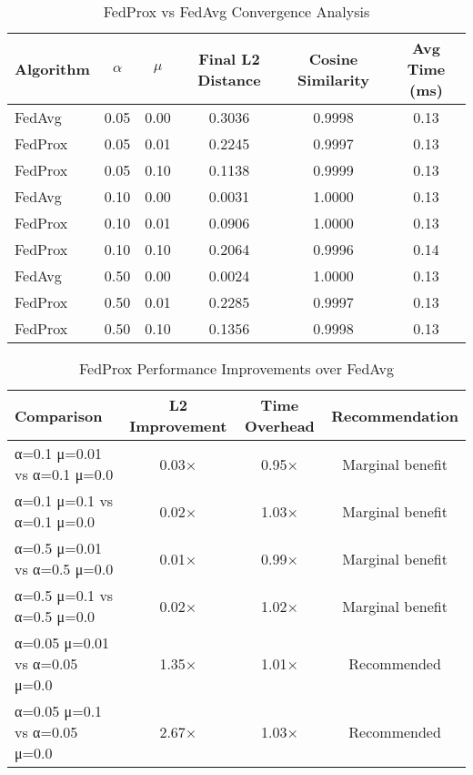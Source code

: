 \begin{table}[htbp]
\centering
\caption{FedProx vs FedAvg Convergence Analysis}
\label{tab:fedprox_convergence}
\begin{tabular}{lccccc}
\toprule
Algorithm & $\alpha$ & $\mu$ & Final L2 Distance & Cosine Similarity & Avg Time (ms) \\
\midrule
FedAvg & 0.05 & 0.00 & 0.3036 & 0.9998 & 0.13 \\
FedProx & 0.05 & 0.01 & 0.2245 & 0.9997 & 0.13 \\
FedProx & 0.05 & 0.10 & 0.1138 & 0.9999 & 0.13 \\
FedAvg & 0.10 & 0.00 & 0.0031 & 1.0000 & 0.13 \\
FedProx & 0.10 & 0.01 & 0.0906 & 1.0000 & 0.13 \\
FedProx & 0.10 & 0.10 & 0.2064 & 0.9996 & 0.14 \\
FedAvg & 0.50 & 0.00 & 0.0024 & 1.0000 & 0.13 \\
FedProx & 0.50 & 0.01 & 0.2285 & 0.9997 & 0.13 \\
FedProx & 0.50 & 0.10 & 0.1356 & 0.9998 & 0.13 \\
\bottomrule
\end{tabular}
\end{table}

\begin{table}[htbp]
\centering
\caption{FedProx Performance Improvements over FedAvg}
\label{tab:fedprox_improvements}
\begin{tabular}{lccc}
\toprule
Comparison & L2 Improvement & Time Overhead & Recommendation \\
\midrule
α=0.1 μ=0.01 vs α=0.1 μ=0.0 & 0.03× & 0.95× & Marginal benefit \\
α=0.1 μ=0.1 vs α=0.1 μ=0.0 & 0.02× & 1.03× & Marginal benefit \\
α=0.5 μ=0.01 vs α=0.5 μ=0.0 & 0.01× & 0.99× & Marginal benefit \\
α=0.5 μ=0.1 vs α=0.5 μ=0.0 & 0.02× & 1.02× & Marginal benefit \\
α=0.05 μ=0.01 vs α=0.05 μ=0.0 & 1.35× & 1.01× & Recommended \\
α=0.05 μ=0.1 vs α=0.05 μ=0.0 & 2.67× & 1.03× & Recommended \\
\bottomrule
\end{tabular}
\end{table}